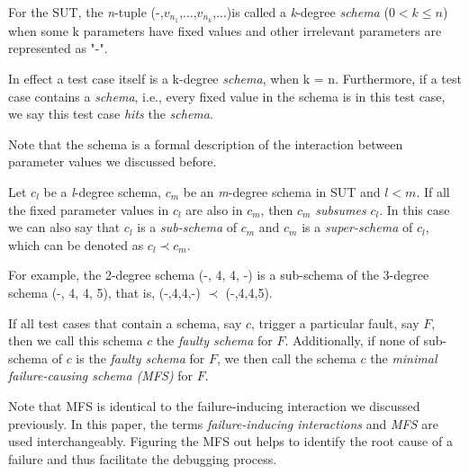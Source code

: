 \documentclass{sig-alternate}
\begin{document}
\begin{definition}
For the SUT, the \emph{n}-tuple (-,$v_{n_{1}}$,...,$v_{n_{k}}$,...)is called a \emph{k}-degree \emph{schema} ($0 < k \leq n $) when some k parameters have fixed values and other irrelevant parameters are represented as "-".

In effect a test case itself is a k-degree \emph{schema}, when k = n. Furthermore, if a test case contains a \emph{schema}, i.e., every fixed value in the schema is in this test case, we say this test case \emph{hits} the \emph{schema}.
\end{definition}

Note that the schema is a formal description of the interaction between parameter values we discussed before.

\begin{definition}
Let $c_{l}$ be a \emph{l}-degree schema, $c_{m}$ be an \emph{m}-degree schema in SUT and $l < m$. If all the fixed parameter values in $c_{l}$ are also in $c_{m}$, then $c_{m}$ \emph{subsumes} $c_{l}$. In this case we can also say that $c_{l}$ is a \emph{sub-schema} of $c_{m}$ and $c_{m}$ is a \emph{super-schema} of $c_{l}$, which can be denoted as $c_{l} \prec  c_{m}$.
\end{definition}

For example,  the 2-degree schema (-, 4, 4, -) is a sub-schema of the 3-degree schema (-, 4, 4, 5), that is, (-,4,4,-) $\prec$ (-,4,4,5).

\begin{definition}
If all test cases that contain a schema, say $c$, trigger a particular fault, say $F$, then we call this schema $c$ the \emph{faulty schema} for $F$. Additionally, if none of sub-schema of $c$ is the \emph{faulty schema} for $F$, we then call the schema $c$ the \emph{minimal failure-causing schema (MFS)} \cite{nie2011minimal} for $F$.

\end{definition}

Note that MFS is identical to the failure-inducing interaction we discussed previously. In this paper, the terms \emph{failure-inducing interactions} and \emph{MFS} are used interchangeably. Figuring the MFS out helps to identify the root cause of a failure and thus facilitate the debugging process.
\end{document}

